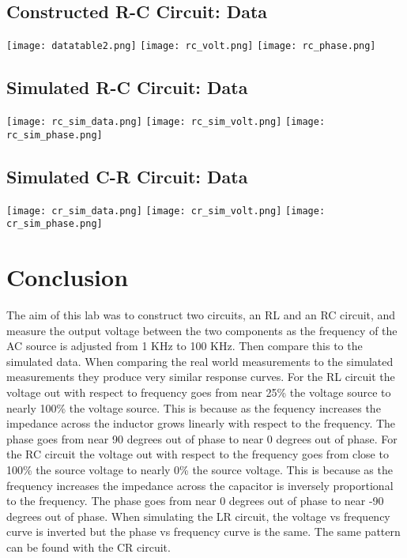 \documentclass[11pt]{article}
\begin{document}
\subsection*{Constructed R-C Circuit: Data}
\begin{center}
    \texttt{[image: datatable2.png]}
    \texttt{[image: rc\_volt.png]}
    \texttt{[image: rc\_phase.png]}
\end{center}

\newpage

\subsection*{Simulated R-C Circuit: Data}
\begin{center}
    \texttt{[image: rc\_sim\_data.png]}
    \texttt{[image: rc\_sim\_volt.png]}
    \texttt{[image: rc\_sim\_phase.png]}
\end{center}

\newpage

\subsection*{Simulated C-R Circuit: Data}
\begin{center}
    \texttt{[image: cr\_sim\_data.png]}
    \texttt{[image: cr\_sim\_volt.png]}
    \texttt{[image: cr\_sim\_phase.png]}
\end{center}

\section*{Conclusion}
The aim of this lab was to construct two circuits, an RL and an RC circuit, and measure the output voltage between the two components as the frequency of the AC source is adjusted from 1 KHz to 100 KHz. Then compare this to the simulated data. When comparing the real world measurements to the simulated measurements they produce very similar response curves. For the RL circuit the voltage out with respect to frequency goes from near 25\% the voltage source to nearly 100\% the voltage source. This is because as the fequency increases the impedance across the inductor grows linearly with respect to the frequency. The phase goes from near 90 degrees out of phase to near 0 degrees out of phase. For the RC circuit the voltage out with respect to the frequency goes from close to 100\% the source voltage to nearly 0\% the source voltage. This is because as the frequency increases the impedance across the capacitor is inversely proportional to the frequency. The phase goes from near 0 degrees out of phase to near -90 degrees out of phase. When simulating the LR circuit, the voltage vs frequency curve is inverted but the phase vs frequency curve is the same. The same pattern can be found with the CR circuit.
\end{document}
